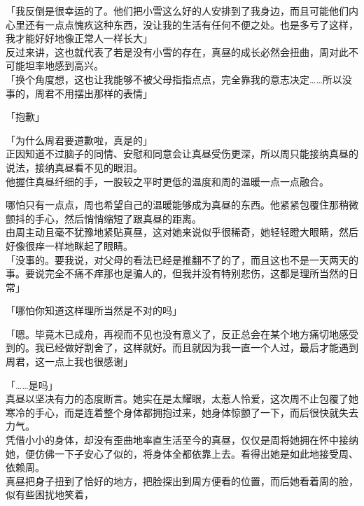「我反倒是很幸运的了。他们把小雪这么好的人安排到了我身边，而且可能他们内心里还有一点点愧疚这种东西，没让我的生活有任何不便之处。也是多亏了这样，我才能好好地像正常人一样长大」\\

反过来讲，这也就代表了若是没有小雪的存在，真昼的成长必然会扭曲，周对此不可能坦率地感到高兴。\\

「换个角度想，这也让我能够不被父母指指点点，完全靠我的意志决定……所以没事的，周君不用摆出那样的表情」

「抱歉」

「为什么周君要道歉啦，真是的」\\

正因知道不过脑子的同情、安慰和同意会让真昼受伤更深，所以周只能接纳真昼的说法，接纳真昼看不见的眼泪。\\

他握住真昼纤细的手，一股较之平时更低的温度和周的温暖一点一点融合。

哪怕只有一点点，周也希望自己的温暖能够成为真昼的东西。他紧紧包覆住那稍微颤抖的手心，然后悄悄缩短了跟真昼的距离。\\

由周主动且毫不犹豫地紧贴真昼，这对她来说似乎很稀奇，她轻轻瞪大眼睛，然后好像很痒一样地眯起了眼睛。\\

「没事的。要我说，对父母的看法已经是推翻不了的了，而且这也不是一天两天的事。要说完全不痛不痒那也是骗人的，但我并没有特别悲伤，这都是理所当然的日常」

「哪怕你知道这样理所当然是不对的吗」

「嗯。毕竟木已成舟，再视而不见也没有意义了，反正总会在某个地方痛切地感受到的。我已经做好割舍了，这样就好。而且就因为我一直一个人过，最后才能遇到周君，这一点上我也很感谢」

「……是吗」\\

真昼以坚决有力的态度断言。她实在是太耀眼，太惹人怜爱，这次周不止包覆了她寒冷的手心，而是连着整个身体都拥抱过来，她身体惊颤了一下，而后很快就失去力气。\\

凭借小小的身体，却没有歪曲地率直生活至今的真昼，仅仅是周将她拥在怀中接纳她，便仿佛一下子安心了似的，将身体全都依靠上去。看得出她是如此地接受周、依赖周。\\

真昼把身子扭到了恰好的地方，把脸探出到周方便看的位置，而后她看着周的脸，似有些困扰地笑着，\\

